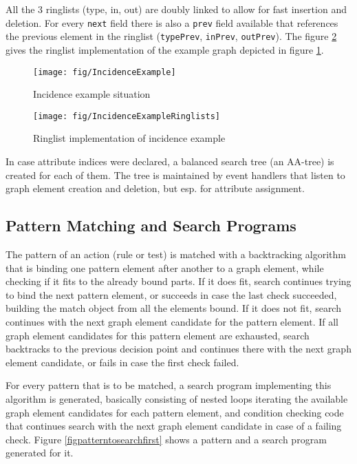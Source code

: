 All the 3 ringlists (type, in, out) are doubly linked to allow for fast insertion and deletion.
For every \texttt{next} field there is also a \texttt{prev} field available that references the previous element in the ringlist (\texttt{typePrev}, \texttt{inPrev}, \texttt{outPrev}).
The figure \ref{figincidenceexampleringlists} gives the ringlist implementation of the example graph depicted in figure \ref{figincidenceexample}. 

\begin{figure}[htbp]
  \centering
  \texttt{[image: fig/IncidenceExample]}
  \caption{Incidence example situation}
  \label{figincidenceexample}
\end{figure}

\begin{figure}[htbp]
  \centering
  \texttt{[image: fig/IncidenceExampleRinglists]}
  \caption{Ringlist implementation of incidence example}
  \label{figincidenceexampleringlists}
\end{figure}

In case attribute indices were declared, a balanced search tree (an AA-tree) is created for each of them.
The tree is maintained by event handlers that listen to graph element creation and deletion, but esp. for attribute assignment.
 
\subsection*{Pattern Matching and Search Programs}

The pattern of an action (rule or test) is matched with a backtracking algorithm that is binding one pattern element after another to a graph element, while checking if it fits to the already bound parts. 
If it does fit, search continues trying to bind the next pattern element, 
or succeeds in case the last check succeeded, building the match object from all the elements bound.
If it does not fit, search continues with the next graph element candidate for the pattern element.
If all graph element candidates for this pattern element are exhausted, search backtracks to the previous decision point and continues there with the next graph element candidate, or fails in case the first check failed.

For every pattern that is to be matched, a search program implementing this algorithm is generated, basically consisting of nested loops iterating the available graph element candidates for each pattern element, and condition checking code that continues search with the next graph element candidate in case of a failing check.
Figure \ref{figpatterntosearchfirst} shows a pattern and a search program generated for it.


